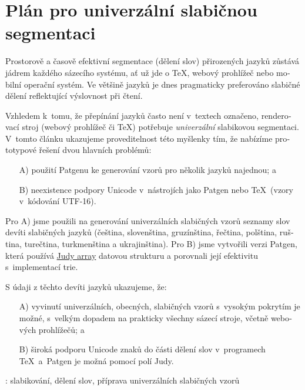 \documentclass{csbulletin}
\let\program=\textrm %
\newcommand{\Patgen}{\program{Patgen}\xspace}
\begin{document}
\section*{Plán pro univerzální slabičnou segmentaci}
\begin{otherlanguage}{czech}
Prostorově a časově efektivní segmentace (dělení slov) přirozených jazyků zůstává jádrem každého sázecího systému, ať už jde o \TeX, webový prohlížeč nebo mobilní operační systém.
Ve většině jazyků je dnes pragmaticky preferováno slabičné dělení reflektující výslovnost při čtení.

Vzhledem k~tomu, že přepínání jazyků často není v~textech označeno, renderovací stroj (webový prohlížeč či \TeX) potřebuje \emph{univerzální} slabikovou segmentaci.
V~tomto článku ukazujeme proveditelnost této myšlenky tím, že nabízíme prototypové řešení dvou hlavních problémů:
\begin{enumerate}
     \item[A)] použití \Patgen{}u ke generování vzorů pro několik jazyků najednou; a
     \item[B)] neexistence podpory Unicode v~nástrojích jako \Patgen{} nebo \TeX\ (vzory v~kódování \mbox{UTF-16}).
\end{enumerate}

Pro A) jsme použili na generování univerzálních slabičných vzorů seznamy slov devíti slabičných jazyků
(čeština, slovenština, gruzínština, řečtina, polština, ruština, turečtina, turkmenština a ukrajinština).
Pro B) jsme vytvořili verzi \Patgen, která používá
\href{https://en.wikipedia.org/wiki/Judy_array}{Judy array} datovou strukturu a porovnali její efektivitu s~implementací trie.

S údaji z těchto devíti jazyků ukazujeme, že:
\begin{enumerate}
     \item[A)] vyvinutí univerzálních, obecných, slabičných vzorů s~vysokým pokrytím je
     možné, s~velkým dopadem na prakticky všechny sázecí stroje,
     včetně webových prohlížečů; a
   \item[B)] široká podporu Unicode znaků do části dělení slov
     v~programech \TeX\ a~\Patgen je možná pomocí polí Judy.
\end{enumerate}
\end{otherlanguage}
\klicovaslova: slabikování, dělení slov, příprava univerzálních slabičných vzorů
\end{document}
